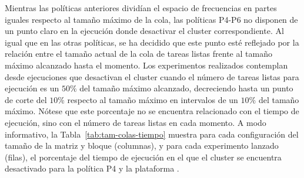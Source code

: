 Mientras las políticas anteriores dividían el espacio de frecuencias en
partes iguales respecto al tamaño máximo de la cola, las políticas P4-P6 no
disponen de un punto claro en la ejecución donde desactivar el cluster
correspondiente. Al igual que en las otras políticas, se ha decidido que
este punto esté reflejado por la relación entre el tamaño actual de la cola
de tareas listas frente al tamaño máximo alcanzado hasta el momento. Los
experimentos realizados contemplan desde ejecuciones que desactivan el
cluster cuando el número de tareas listas para ejecución es un $50\%$ del
tamaño máximo alcanzado, decreciendo hasta un punto de corte del $10\%$
respecto al tamaño máximo en intervalos de un $10\%$ del tamaño máximo.
Nótese que este porcentaje no se encuentra relacionado con el tiempo de
ejecución, sino con el número de tareas listas en cada momento. A modo
informativo, la Tabla~\ref{tab:tam-colas-tiempo} muestra para cada
configuración del tamaño de la matriz y bloque (columnas), y para cada
experimento lanzado (filas), el porcentaje del tiempo de ejecución en el
que el cluster se encuentra desactivado para la política P4 y la plataforma
\juno.

